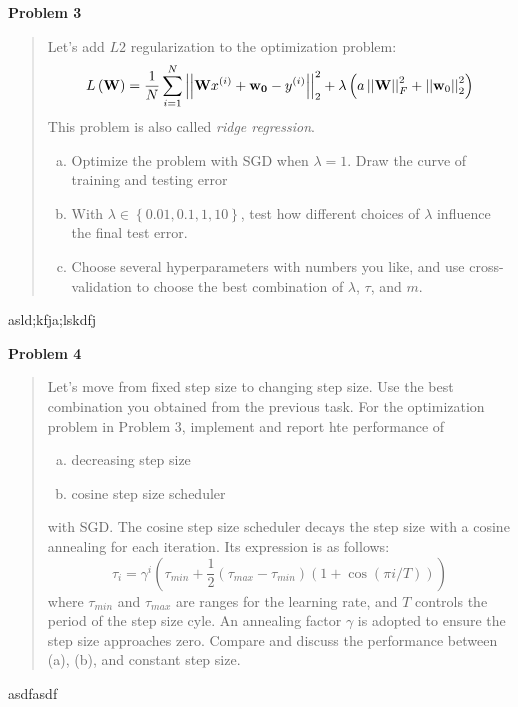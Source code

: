 \documentclass{article}
\newenvironment{quotationb}%
{\begin{leftbar}\begin{quotation}\noindent}
{\end{quotation}\end{leftbar}}
\newcommand{\norm}[2]{\left|\left| #2 \right|\right|_{#1}}
\begin{document}
\newpage

\bigskip
{\Large {\bf Problem 3}}
\bigskip

\begin{quotationb}Let's add $L2$ regularization to the optimization problem:
$$
L\left( {\bf W} \right) = \frac{1}{N}\sum_{i=1}^{N} \norm{2}{{\bf W}x^{(i)} + {\bf w_0} - y^{(i)}}^2  + \lambda \left( a  \norm{F}{\textbf{W}}^2 + \norm{2}{\textbf{w}_0}^2 \right)
$$
This problem is also called {\it ridge regression}.
\begin{enumerate}[(a)]
\item Optimize the problem with SGD when $\lambda = 1$. Draw the curve of training and testing error
\item With $\lambda \in \left\{0.01, 0.1, 1, 10\right\}$, test how different choices of $\lambda$ influence the final test error.
\item Choose several hyperparameters with numbers you like, and use cross-validation to choose the best combination of $\lambda$, $\tau$, and $m$.
\end{enumerate}
\end{quotationb}

asld;kfja;lskdfj


\bigskip
{\Large {\bf Problem 4}}
\bigskip

\begin{quotationb}Let's move from fixed step size to changing step size. Use the best combination you obtained from the previous task. For the optimization problem in Problem 3, implement and report hte performance of
\begin{enumerate}[(a)]
\item decreasing step size
\item cosine step size scheduler
\end{enumerate}
with SGD. The cosine step size scheduler decays the step size with a cosine annealing for each iteration. Its expression is as follows:
$$
\tau_i = \gamma^i \left( \tau_{min} + \frac{1}{2} \left(\tau_{max} - \tau_{min}\right)\left(1 + \cos\left(\pi i / T \right) \right) \right)
$$
where $\tau_{min}$ and $\tau_{max}$ are ranges for the learning rate, and $T$ controls the period of the step size cyle. An annealing factor $\gamma$ is adopted to ensure the step size approaches zero. Compare and discuss the performance between (a), (b), and constant step size. 
\end{quotationb}

asdfasdf
\end{document}
